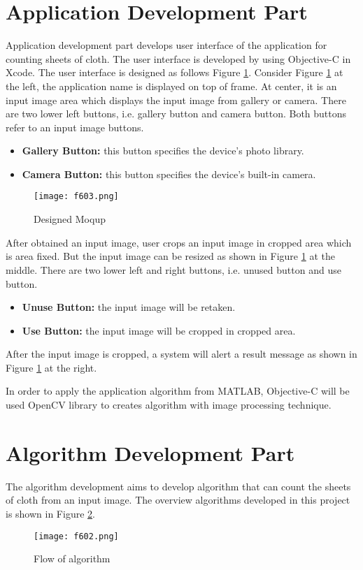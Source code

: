 \section{Application Development Part}
Application development part develops user interface of the application for counting sheets of cloth. The user interface is developed by using Objective-C in Xcode. The user interface is designed as follows Figure \ref{fig:f603}. Consider Figure \ref{fig:f603} at the left, the application name is displayed on top of frame. At center, it is an input image area which displays the input image from gallery or camera. There are two lower left buttons, i.e. gallery button and camera button. Both buttons refer to an input image buttons.
\begin{itemize}
	\item{\textbf{Gallery Button:} this button specifies the device’s photo library.}
	\item{\textbf{Camera Button:} this button specifies the device’s built-in camera.}
\end{itemize}
\begin{figure}[t]
	\centering
	\texttt{[image: f603.png]}
	\caption{Designed Moqup}
	\label{fig:f603}
\end{figure}
After obtained an input image, user crops an input image in cropped area which is area fixed. But the input image can be resized as shown in Figure \ref{fig:f603} at the middle. There are two lower left and right buttons, i.e. unused button and use button.
\begin{itemize}
	\item{\textbf{Unuse Button:} the input image will be retaken.}
	\item{\textbf{Use Button:} the input image will be cropped in cropped area.}
\end{itemize}
After the input image is cropped, a system will alert a result message as shown in Figure \ref{fig:f603} at the right.

In order to apply the application algorithm from MATLAB, Objective-C will be used OpenCV library to creates algorithm with image processing technique.

\section{Algorithm Development Part}
The algorithm development aims to develop algorithm that can count the sheets of cloth from an input image. The overview algorithms developed in this project is shown in Figure \ref{fig:f602}.
\begin{figure}[t]
	\centering
	\texttt{[image: f602.png]}
	\caption{Flow of algorithm}
	\label{fig:f602}
\end{figure}


